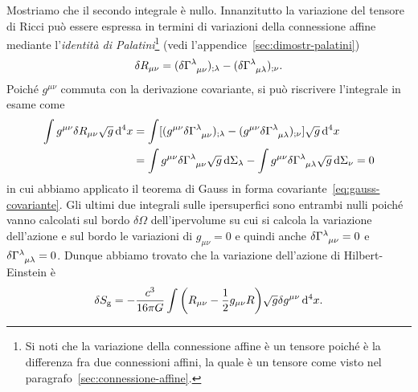 Mostriamo che il secondo integrale è nullo.  Innanzitutto la
variazione del tensore di Ricci può
essere espressa in termini di variazioni della connessione affine mediante
l'\emph{identità di Palatini}\footnote{Si
  noti che la variazione della connessione affine è un tensore poiché è la
  differenza fra due connessioni affini, la quale è un tensore come visto nel
  paragrafo~\ref{sec:connessione-affine}.}
(vedi l'appendice~\ref{sec:dimostr-palatini})
\begin{equation}
  \delta R_{\mu\nu} = (\delta \tensor{\Gamma}{^{\lambda}_{\mu\nu}})_{;\lambda} -
  (\delta \tensor{\Gamma}{^{\lambda}_{\mu\lambda}})_{;\nu}.
\end{equation}
Poiché $g^{\mu\nu}$ commuta con la derivazione covariante, si può riscrivere
l'integrale in esame come
\begin{equation}
  \begin{split}
    \int g^{\mu\nu} \delta R_{\mu\nu} \sqrt{g} \dd^{4} x &= \int [ ( g^{\mu\nu}
    \delta \tensor{\Gamma}{^{\lambda}_{\mu\nu}} )_{;\lambda} - ( g^{\mu\nu} \delta
    \tensor{\Gamma}{^{\lambda}_{\mu\lambda}})_{;\nu} ] \sqrt{g} \dd^{4} x \\
    &= \int g^{\mu\nu} \delta \tensor{\Gamma}{^{\lambda}_{\mu\nu}} \sqrt{g} \dd
    \Sigma_{\lambda} - \int g^{\mu\nu}
    \delta\tensor{\Gamma}{^{\lambda}_{\mu\lambda}} \sqrt{g}\dd\Sigma_{\nu} = 0
  \end{split}
\end{equation}
in cui abbiamo applicato il teorema di Gauss in forma
covariante~\eqref{eq:gauss-covariante}.  Gli ultimi due integrali sulle
ipersuperfici sono entrambi nulli poiché vanno calcolati sul bordo
$\delta\Omega$ dell'ipervolume su cui si calcola la variazione dell'azione e sul
bordo le variazioni di $g_{\mu\nu} = 0$ e quindi anche $\delta
\tensor{\Gamma}{^{\lambda}_{\mu\nu}} = 0$ e $\delta
\tensor{\Gamma}{^{\lambda}_{\mu\lambda}} = 0$.  Dunque abbiamo trovato che la
variazione dell'azione di Hilbert-Einstein è
\begin{equation}
  \delta S_{\textup{g}} = -\frac{c^{3}}{16\pi G} \int \bigg( R_{\mu\nu} -
  \frac{1}{2} g_{\mu\nu} R \bigg)\sqrt{g} \delta g^{\mu\nu} \mathop{}\!\mathrm{d}^{4} x.
\end{equation}


